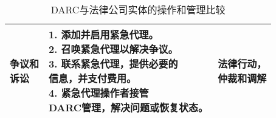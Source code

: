 \documentclass[main.tex]{subfiles}
\begin{document}
\begin{table}[h!]
\begin{tabular}{| l | l| l|}
    \hline 
    \makecell[l]{争议和\\ 诉讼} & \makecell[l]{1. 添加并启用紧急代理。 \\ 2. 召唤紧急代理以解决争议。 \\ 3. 联系紧急代理，提供必要的\\ 信息，并支付费用。 \\ 4. 紧急代理操作者接管\\ DARC管理，解决问题或恢复状态。} & \makecell[l]{法律行动，\\ 仲裁和调解} \\
    \hline
    
    
    
        \hline
    \end{tabular}
    \caption{DARC与法律公司实体的操作和管理比较}
    \label{table:5}
    \end{table}
\end{document}
